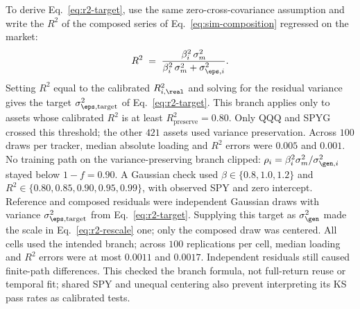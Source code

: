 To derive Eq.~\eqref{eq:r2-target}, use the same zero-cross-covariance
assumption and write the $R^2$ of the composed series of
Eq.~\eqref{eq:sim-composition} regressed on the market:
\begin{equation}
  R^2 \;=\; \frac{\beta_i^2\, \sigma_m^2}{\beta_i^2\, \sigma_m^2 + \sigma_{\eps,i}^2}.
\end{equation}
Setting $R^2$ equal to the calibrated $R^2_{i,\real}$ and solving for
the residual variance gives the target $\sigma_{\eps,\mathrm{target}}^2$
of Eq.~\eqref{eq:r2-target}. This branch applies only to assets whose
calibrated $R^2$ is at least $R^2_{\mathrm{preserve}} = 0.80$. Only QQQ and SPYG crossed this threshold; the other $421$ assets used variance preservation. Across $100$ draws per tracker, median absolute loading and $R^2$ errors were $0.005$ and $0.001$. No training path on the variance-preserving branch clipped: $\rho_i = \beta_i^2 \sigma_m^2 / \sigma_{\gen,i}^2$ stayed below $1-f=0.90$.
A Gaussian check used $\beta\in\{0.8,1.0,1.2\}$ and $R^2\in\{0.80,0.85,0.90,0.95,0.99\}$, with observed SPY and zero intercept. Reference and composed residuals were independent Gaussian draws with variance $\sigma_{\eps,\mathrm{target}}^2$ from Eq.~\eqref{eq:r2-target}. Supplying this target as $\sigma_{\gen}^2$ made the scale in Eq.~\eqref{eq:r2-rescale} one; only the composed draw was centered. All cells used the intended branch; across $100$ replications per cell, median loading and $R^2$ errors were at most $0.0011$ and $0.0017$. Independent residuals still caused finite-path differences. This checked the branch formula, not full-return reuse or temporal fit; shared SPY and unequal centering also prevent interpreting its KS pass rates as calibrated tests.

